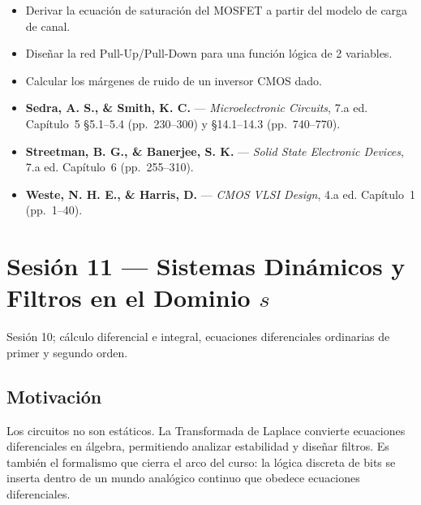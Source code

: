 \documentclass[11pt, letterpaper]{article}
\begin{document}
\begin{objetivos}
\begin{itemize}
  \item Derivar la ecuaci\'on de saturaci\'on del MOSFET a partir del modelo de carga de canal.
  \item Dise\~nar la red Pull-Up/Pull-Down para una funci\'on l\'ogica de 2 variables.
  \item Calcular los m\'argenes de ruido de un inversor CMOS dado.
\end{itemize}
\end{objetivos}

\begin{lecturas}
\begin{itemize}
  \item[$(\star)$] \textbf{Sedra, A. S., \& Smith, K. C.} --- \emph{Microelectronic Circuits}, 7.a ed. Cap\'itulo~5 \S5.1--5.4 (pp.\ 230--300) y \S14.1--14.3 (pp.\ 740--770).
  \item[$(\star)$] \textbf{Streetman, B. G., \& Banerjee, S. K.} --- \emph{Solid State Electronic Devices}, 7.a ed. Cap\'itulo~6 (pp.\ 255--310).
  \item \textbf{Weste, N. H. E., \& Harris, D.} --- \emph{CMOS VLSI Design}, 4.a ed. Cap\'itulo~1 (pp.\ 1--40).
\end{itemize}
\end{lecturas}

\newpage

\section{Sesi\'on 11 --- Sistemas Din\'amicos y Filtros en el Dominio $s$}

\begin{prereqs}
Sesi\'on 10; c\'alculo diferencial e integral, ecuaciones diferenciales ordinarias de primer y segundo orden.
\end{prereqs}

\subsection*{Motivaci\'on}
Los circuitos no son est\'aticos. La Transformada de Laplace convierte ecuaciones diferenciales en \'algebra, permitiendo analizar estabilidad y dise\~nar filtros. Es tambi\'en el formalismo que cierra el arco del curso: la l\'ogica discreta de bits se inserta dentro de un mundo anal\'ogico continuo que obedece ecuaciones diferenciales.
\end{document}
